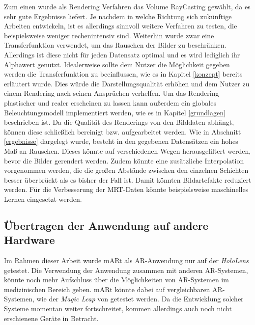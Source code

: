 Zum einen wurde als Rendering Verfahren das Volume RayCasting gewählt, da es sehr gute Ergebnisse liefert. Je nachdem in welche Richtung sich zukünftige Arbeiten entwickeln, ist es allerdings sinnvoll weitere Verfahren zu testen, die beispielsweise weniger rechenintensiv sind. 
Weiterhin wurde zwar eine Transferfunktion verwendet, um das Rauschen der Bilder zu beschränken. Allerdings ist diese nicht für jeden Datensatz optimal und es wird lediglich ihr Alphawert genutzt. 
Idealerweise sollte dem Nutzer die Möglichkeit gegeben werden die Transferfunktion zu beeinflussen, wie es in Kapitel \ref{konzept} bereits erläutert wurde. Dies würde die Darstellungsqualität erhöhen und dem Nutzer zu einem Rendering nach seinen Ansprüchen verhelfen. 
Um das Rendering plastischer und realer erscheinen zu lassen kann außerdem ein globales Beleuchtungsmodell implementiert werden, wie es in Kapitel \ref{grundlagen} beschrieben ist. 
Da die Qualität des Renderings von den Bilddaten abhängt, können diese schließlich bereinigt bzw. aufgearbeitet werden. Wie in Abschnitt \ref{ergebnisse} dargelegt wurde, besteht in den gegebenen Datensätzen ein hohes Maß an Rauschen. Dieses könnte auf verschiedenen Wegen herausgefiltert werden, bevor die Bilder gerendert werden. Zudem könnte eine zusätzliche Interpolation vorgenommen werden, die die großen Abstände zwischen den einzelnen Schichten besser überbrückt als es bisher der Fall ist. Damit könnten Bildartefakte reduziert werden. 
Für die Verbesserung der MRT-Daten könnte beispielsweise maschinelles Lernen eingesetzt werden.

\subsection{Übertragen der Anwendung auf andere Hardware}
\label{hololens2Fazit}

Im Rahmen dieser Arbeit wurde mARt als AR-Anwendung nur auf der \textit{HoloLens} getestet. 
Die Verwendung der Anwendung zusammen mit anderen AR-Systemen, könnte noch mehr Aufschluss über die Möglichkeiten von AR-Systemen im medizinischen Bereich geben. 
mARt könnte dabei auf vergleichbaren AR-Systemen, wie der \textit{Magic Leap} von \cite{magicLeap} getestet werden.
Da die Entwicklung solcher Systeme momentan weiter fortschreitet, kommen allerdings auch noch nicht erschienene Geräte in Betracht.

